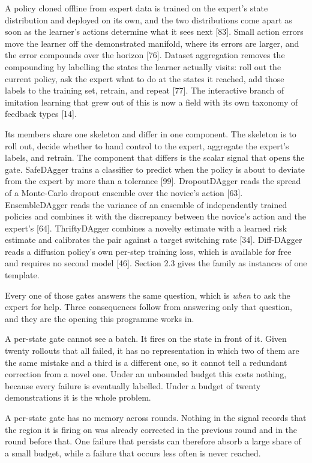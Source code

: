 \documentclass[
  11pt,
]{article}
\begin{document}
A policy cloned offline from expert data is trained on the expert's
state distribution and deployed on its own, and the two distributions
come apart as soon as the learner's actions determine what it sees next
{[}83{]}. Small action errors move the learner off the demonstrated
manifold, where its errors are larger, and the error compounds over the
horizon {[}76{]}. Dataset aggregation removes the compounding by
labelling the states the learner actually visits: roll out the current
policy, ask the expert what to do at the states it reached, add those
labels to the training set, retrain, and repeat {[}77{]}. The
interactive branch of imitation learning that grew out of this is now a
field with its own taxonomy of feedback types {[}14{]}.

Its members share one skeleton and differ in one component. The skeleton
is to roll out, decide whether to hand control to the expert, aggregate
the expert's labels, and retrain. The component that differs is the
scalar signal that opens the gate. SafeDAgger trains a classifier to
predict when the policy is about to deviate from the expert by more than
a tolerance {[}99{]}. DropoutDAgger reads the spread of a Monte-Carlo
dropout ensemble over the novice's action {[}63{]}. EnsembleDAgger reads
the variance of an ensemble of independently trained policies and
combines it with the discrepancy between the novice's action and the
expert's {[}64{]}. ThriftyDAgger combines a novelty estimate with a
learned risk estimate and calibrates the pair against a target switching
rate {[}34{]}. Diff-DAgger reads a diffusion policy's own per-step
training loss, which is available for free and requires no second model
{[}46{]}. Section 2.3 gives the family as instances of one template.

Every one of those gates answers the same question, which is \emph{when}
to ask the expert for help. Three consequences follow from answering
only that question, and they are the opening this programme works in.

A per-state gate cannot see a batch. It fires on the state in front of
it. Given twenty rollouts that all failed, it has no representation in
which two of them are the same mistake and a third is a different one,
so it cannot tell a redundant correction from a novel one. Under an
unbounded budget this costs nothing, because every failure is eventually
labelled. Under a budget of twenty demonstrations it is the whole
problem.

A per-state gate has no memory across rounds. Nothing in the signal
records that the region it is firing on was already corrected in the
previous round and in the round before that. One failure that persists
can therefore absorb a large share of a small budget, while a failure
that occurs less often is never reached.
\end{document}
